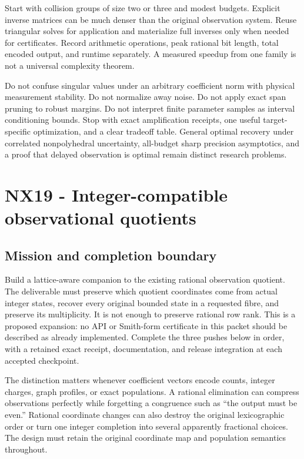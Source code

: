 \documentclass[
  11pt,
  a4paper,
]{report}
\let\nxtexttt\texttt
\renewcommand{\texttt}[1]{\nxtexttt{\seqsplit{#1}}}
\begin{document}
Start with collision groups of size two or three and modest budgets.
Explicit inverse matrices can be much denser than the original
observation system. Reuse triangular solves for application and
materialize full inverses only when needed for certificates. Record
arithmetic operations, peak rational bit length, total encoded output,
and runtime separately. A measured speedup from one family is not a
universal complexity theorem.

Do not confuse singular values under an arbitrary coefficient norm with
physical measurement stability. Do not normalize away noise. Do not
apply exact span pruning to robust margins. Do not interpret finite
parameter samples as interval conditioning bounds. Stop with exact
amplification receipts, one useful target-specific optimization, and a
clear tradeoff table. General optimal recovery under correlated
nonpolyhedral uncertainty, all-budget sharp precision asymptotics, and a
proof that delayed observation is optimal remain distinct research
problems.

\hypertarget{nx19---integer-compatible-observational-quotients}{%
\chapter{NX19 - Integer-compatible observational
quotients}\label{nx19---integer-compatible-observational-quotients}}

\hypertarget{mission-and-completion-boundary}{%
\section{Mission and completion
boundary}\label{mission-and-completion-boundary}}

Build a lattice-aware companion to the existing rational observation
quotient. The deliverable must preserve which quotient coordinates come
from actual integer states, recover every original bounded state in a
requested fibre, and preserve its multiplicity. It is not enough to
preserve rational row rank. This is a proposed expansion: no
\texttt{integer\_quotient} API or Smith-form certificate in this packet
should be described as already implemented. Complete the three pushes
below in order, with a retained exact receipt, documentation, and
release integration at each accepted checkpoint.

The distinction matters whenever coefficient vectors encode counts,
integer charges, graph profiles, or exact populations. A rational
elimination can compress observations perfectly while forgetting a
congruence such as ``the output must be even.'' Rational coordinate
changes can also destroy the original lexicographic order or turn one
integer completion into several apparently fractional choices. The
design must retain the original coordinate map and population semantics
throughout.
\end{document}
